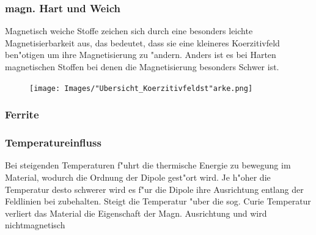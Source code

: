         \subsubsection*{magn. Hart und Weich}
            Magnetisch weiche Stoffe zeichen sich durch eine besonders leichte Magnetisierbarkeit aus, das bedeutet,
            dass sie eine kleineres Koerzitivfeld ben"otigen um ihre Magnetisierung zu "andern. Anders ist es bei Harten
            magnetischen Stoffen bei denen die Magnetisierung besonders Schwer ist.
            \begin{figure}[H]
                \centering
                \texttt{[image: Images/"Ubersicht\_Koerzitivfeldst"arke.png]}
            \end{figure}
        \subsubsection*{Ferrite}

        \subsubsection*{Temperatureinfluss}
            Bei steigenden Temperaturen f"uhrt die thermische Energie zu bewegung im Material, wodurch die Ordnung der
            Dipole gest"ort wird. Je h"oher die Temperatur desto schwerer wird es f"ur die Dipole ihre Ausrichtung entlang
            der Feldlinien bei zubehalten. Steigt die Temperatur "uber die sog. Curie Temperatur verliert das Material
            die Eigenschaft der Magn. Ausrichtung und wird nichtmagnetisch
